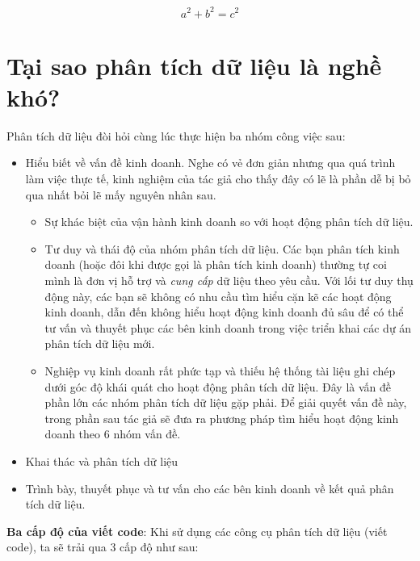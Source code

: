 \documentclass[]{krantz}
\providecommand{\tightlist}{%
  \setlength{\itemsep}{0pt}\setlength{\parskip}{0pt}}
\theoremstyle{definition}
\theoremstyle{definition}
\theoremstyle{definition}
\theoremstyle{remark}
\begin{document}
\[a^2 + b^2 = c^2\]

\hypertarget{tai-sao-phan-tich-d-liu-la-ngh-kho}{%
\section{Tại sao phân tích dữ liệu là nghề
khó?}\label{tai-sao-phan-tich-d-liu-la-ngh-kho}}

Phân tích dữ liệu đòi hỏi cùng lúc thực hiện ba nhóm công việc sau:

\begin{itemize}
\tightlist
\item
  Hiểu biết về vấn đề kinh doanh. Nghe có vẻ đơn giản nhưng qua quá
  trình làm việc thực tế, kinh nghiệm của tác giả cho thấy đây có lẽ là
  phần dễ bị bỏ qua nhất bỏi lẽ mấy nguyên nhân sau.

  \begin{itemize}
  \tightlist
  \item
    Sự khác biệt của vận hành kinh doanh so với hoạt động phân tích dữ
    liệu.
  \item
    Tư duy và thái độ của nhóm phân tích dữ liệu. Các bạn phân tích kinh
    doanh (hoặc đôi khi được gọi là phân tích kinh doanh) thường tự coi
    mình là đơn vị hỗ trợ và \emph{cung cấp} dữ liệu theo yêu cầu. Với
    lối tư duy thụ động này, các bạn sẽ không có nhu cầu tìm hiểu cặn kẽ
    các hoạt động kinh doanh, dẫn đến không hiểu hoạt động kinh doanh đủ
    sâu để có thể tư vấn và thuyết phục các bên kinh doanh trong việc
    triển khai các dự án phân tích dữ liệu mới.
  \item
    Nghiệp vụ kinh doanh rất phức tạp và thiếu hệ thống tài liệu ghi
    chép dưới góc độ khái quát cho hoạt động phân tích dữ liệu. Đây là
    vấn đề phần lớn các nhóm phân tích dữ liệu gặp phải. Để giải quyết
    vấn đề này, trong phần sau tác giả sẽ đưa ra phương pháp tìm hiểu
    hoạt động kinh doanh theo 6 nhóm vấn đề.
  \end{itemize}
\item
  Khai thác và phân tích dữ liệu
\item
  Trình bày, thuyết phục và tư vấn cho các bên kinh doanh về kết quả
  phân tích dữ liệu.
\end{itemize}

\textbf{Ba cấp độ của viết code}: Khi sử dụng các công cụ phân tích dữ
liệu (viết code), ta sẽ trải qua 3 cấp độ như sau:
\end{document}
